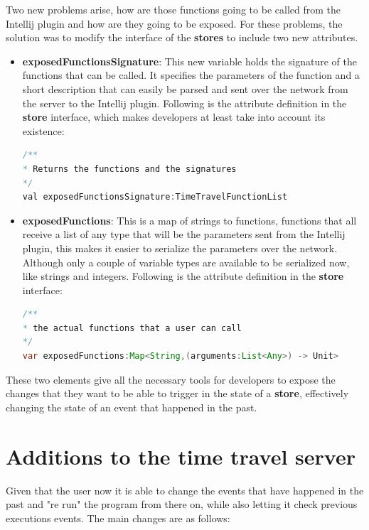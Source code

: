 Two new problems arise, how are those functions going to be called from the Intellij plugin and how are they going to be exposed. For these problems, the solution was to modify the interface of the \textbf{stores} to include two new attributes.

\begin{itemize}
    \item \textbf{exposedFunctionsSignature}: This new variable holds the signature of the functions that can be called. It specifies the parameters of the function and a short description that can easily be parsed and sent over the network from the server to the Intellij plugin. Following is the attribute definition in the \textbf{store} interface, which makes developers at least take into account its existence:
    
\begin{lstlisting}[language=java]
/**
* Returns the functions and the signatures
*/
val exposedFunctionsSignature:TimeTravelFunctionList
\end{lstlisting}
	\item \textbf{exposedFunctions}: This is a map of strings to functions, functions that all receive a list of any type that will be the parameters sent from the Intellij plugin, this makes it easier to serialize the parameters over the network. Although only a couple of variable types are available to be serialized now, like strings and integers. Following is the attribute definition in the \textbf{store} interface:
\begin{lstlisting}[language=java]
/**
* the actual functions that a user can call
*/
var exposedFunctions:Map<String,(arguments:List<Any>) -> Unit>
\end{lstlisting}
\end{itemize}

These two elements give all the necessary tools for developers to expose the changes that they want to be able to trigger in the state of a \textbf{store}, effectively changing the state of an event that happened in the past.

\section{Additions to the time travel server}

Given that the user now it is able to change the events that have happened in the past and "re run" the program from there on, while also letting it check previous executions events. The main changes are as follows:

